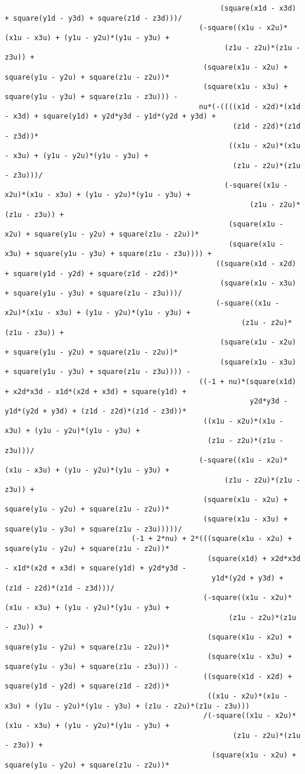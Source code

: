 \begin{lstlisting}
												   (square(x1d - x3d) + square(y1d - y3d) + square(z1d - z3d)))/
											  (-square((x1u - x2u)*(x1u - x3u) + (y1u - y2u)*(y1u - y3u) + 
													(z1u - z2u)*(z1u - z3u)) + 
											   (square(x1u - x2u) + square(y1u - y2u) + square(z1u - z2u))*
											   (square(x1u - x3u) + square(y1u - y3u) + square(z1u - z3u))) - 
											  nu*(-((((x1d - x2d)*(x1d - x3d) + square(y1d) + y2d*y3d - y1d*(y2d + y3d) + 
													  (z1d - z2d)*(z1d - z3d))*
													 ((x1u - x2u)*(x1u - x3u) + (y1u - y2u)*(y1u - y3u) + 
													  (z1u - z2u)*(z1u - z3u)))/
													(-square((x1u - x2u)*(x1u - x3u) + (y1u - y2u)*(y1u - y3u) + 
														  (z1u - z2u)*(z1u - z3u)) + 
													 (square(x1u - x2u) + square(y1u - y2u) + square(z1u - z2u))*
													 (square(x1u - x3u) + square(y1u - y3u) + square(z1u - z3u)))) + 
												  ((square(x1d - x2d) + square(y1d - y2d) + square(z1d - z2d))*
												   (square(x1u - x3u) + square(y1u - y3u) + square(z1u - z3u)))/
												  (-square((x1u - x2u)*(x1u - x3u) + (y1u - y2u)*(y1u - y3u) + 
														(z1u - z2u)*(z1u - z3u)) + 
												   (square(x1u - x2u) + square(y1u - y2u) + square(z1u - z2u))*
												   (square(x1u - x3u) + square(y1u - y3u) + square(z1u - z3u)))) - 
											  ((-1 + nu)*(square(x1d) + x2d*x3d - x1d*(x2d + x3d) + square(y1d) + 
														  y2d*y3d - y1d*(y2d + y3d) + (z1d - z2d)*(z1d - z3d))*
											   ((x1u - x2u)*(x1u - x3u) + (y1u - y2u)*(y1u - y3u) + 
												(z1u - z2u)*(z1u - z3u)))/
											  (-square((x1u - x2u)*(x1u - x3u) + (y1u - y2u)*(y1u - y3u) + 
													(z1u - z2u)*(z1u - z3u)) + 
											   (square(x1u - x2u) + square(y1u - y2u) + square(z1u - z2u))*
											   (square(x1u - x3u) + square(y1u - y3u) + square(z1u - z3u)))))/
							  (-1 + 2*nu) + 2*(((square(x1u - x2u) + square(y1u - y2u) + square(z1u - z2u))*
												(square(x1d) + x2d*x3d - x1d*(x2d + x3d) + square(y1d) + y2d*y3d - 
												 y1d*(y2d + y3d) + (z1d - z2d)*(z1d - z3d)))/
											   (-square((x1u - x2u)*(x1u - x3u) + (y1u - y2u)*(y1u - y3u) + 
													 (z1u - z2u)*(z1u - z3u)) + 
												(square(x1u - x2u) + square(y1u - y2u) + square(z1u - z2u))*
												(square(x1u - x3u) + square(y1u - y3u) + square(z1u - z3u))) - 
											   ((square(x1d - x2d) + square(y1d - y2d) + square(z1d - z2d))*
												((x1u - x2u)*(x1u - x3u) + (y1u - y2u)*(y1u - y3u) + (z1u - z2u)*(z1u - z3u)))
											   /(-square((x1u - x2u)*(x1u - x3u) + (y1u - y2u)*(y1u - y3u) + 
													  (z1u - z2u)*(z1u - z3u)) + 
												 (square(x1u - x2u) + square(y1u - y2u) + square(z1u - z2u))*

\end{lstlisting}
